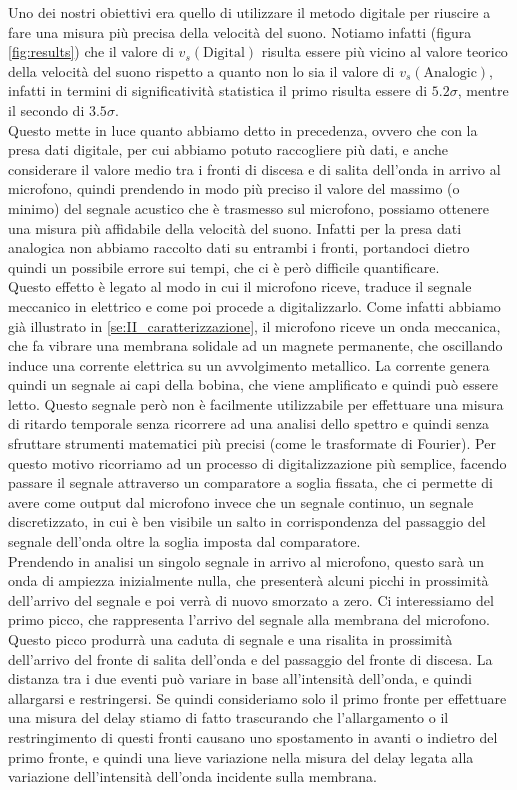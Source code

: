 \documentclass[
    prl,
    reprint, 
    superscriptaddress, 
    altaffilletter, 
    amsmath, 
    amssymb, 
    a4paper,
    varvw]{revtex4-2}
\begin{document}
Uno dei nostri obiettivi era quello di utilizzare il metodo digitale per riuscire a fare una misura più precisa della velocità del suono. Notiamo infatti (figura \ref{fig:results}) che il valore di $v_s(\text{Digital})$ risulta essere più vicino al valore teorico della velocità del suono rispetto a quanto non lo sia il valore di $v_s(\text{Analogic})$, infatti in termini di significatività statistica il primo risulta essere di $5.2\sigma$, mentre il secondo di $3.5\sigma$. \\
Questo mette in luce quanto abbiamo detto in precedenza, ovvero che con la presa dati digitale, per cui abbiamo potuto raccogliere più dati, e anche considerare il valore medio tra i fronti di discesa e di salita dell'onda in arrivo al microfono, quindi prendendo in modo più preciso il valore del massimo (o minimo) del segnale acustico che è trasmesso sul microfono, possiamo ottenere una misura più affidabile della velocità del suono. Infatti per la presa dati analogica non abbiamo raccolto dati su entrambi i fronti, portandoci dietro quindi un possibile errore sui tempi, che ci è però difficile quantificare. \\
Questo effetto è legato al modo in cui il microfono riceve, traduce il segnale meccanico in elettrico e come poi procede a digitalizzarlo. Come infatti abbiamo già illustrato in \ref{se:II_caratterizzazione}, il microfono riceve un onda meccanica, che fa vibrare una membrana solidale ad un magnete permanente, che oscillando induce una corrente elettrica su un avvolgimento metallico. La corrente genera quindi un segnale ai capi della bobina, che viene amplificato e quindi può essere letto. Questo segnale però non è facilmente utilizzabile per effettuare una misura di ritardo temporale senza ricorrere ad una analisi dello spettro e quindi senza sfruttare strumenti matematici più precisi (come le trasformate di Fourier). Per questo motivo ricorriamo ad un processo di digitalizzazione più semplice, facendo passare il segnale attraverso un comparatore a soglia fissata, che ci permette di avere come output dal microfono invece che un segnale continuo, un segnale discretizzato, in cui è ben visibile un salto in corrispondenza del passaggio del segnale dell'onda oltre la soglia imposta dal comparatore. \\
Prendendo in analisi un singolo segnale in arrivo al microfono, questo sarà un onda di ampiezza inizialmente nulla, che presenterà alcuni picchi in prossimità dell'arrivo del segnale e poi verrà di nuovo smorzato a zero. Ci interessiamo del primo picco, che rappresenta l'arrivo del segnale alla membrana del microfono. Questo picco produrrà una caduta di segnale e una risalita in prossimità dell'arrivo del fronte di salita dell'onda e del passaggio del fronte di discesa. La distanza tra i due eventi può variare in base all'intensità dell'onda, e quindi allargarsi e restringersi. Se quindi consideriamo solo il primo fronte per effettuare una misura del delay stiamo di fatto trascurando che l'allargamento o il restringimento di questi fronti causano uno spostamento in avanti o indietro del primo fronte, e quindi una lieve variazione nella misura del delay legata alla variazione dell'intensità dell'onda incidente sulla membrana. \\
\end{document}
